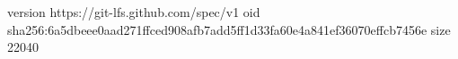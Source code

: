 version https://git-lfs.github.com/spec/v1
oid sha256:6a5dbeee0aad271ffced908afb7add5ff1d33fa60e4a841ef36070effcb7456e
size 22040
